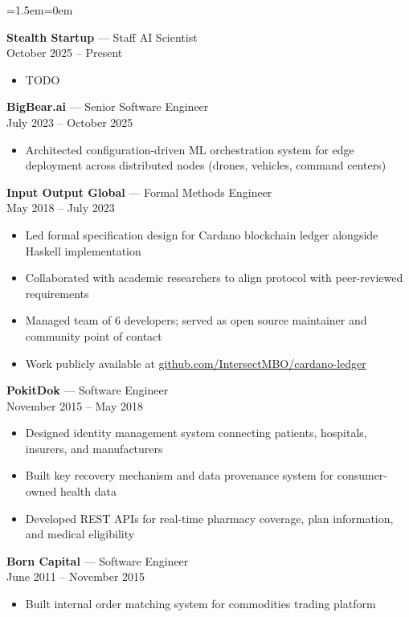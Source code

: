 \documentclass[11pt,letterpaper]{article}
\newenvironment{indentblock}{\begin{list}{}{\leftmargin=1.5em\rightmargin=0em}\item[]}{\end{list}}
\begin{document}
\begin{indentblock}
{\color{headercolor}\textbf{Stealth Startup}} --- Staff AI Scientist \\
October 2025 -- Present
\begin{itemize}[leftmargin=2em]
  \item TODO
\end{itemize}

\vspace{2pt}

{\color{headercolor}\textbf{BigBear.ai}} --- Senior Software Engineer \\
July 2023 -- October 2025
\begin{itemize}[leftmargin=2em]
  \item Architected configuration-driven ML orchestration system for edge deployment across distributed nodes (drones, vehicles, command centers)
\end{itemize}

\vspace{2pt}

{\color{headercolor}\textbf{Input Output Global}} --- Formal Methods Engineer \\
May 2018 -- July 2023
\begin{itemize}[leftmargin=2em]
  \item Led formal specification design for Cardano blockchain ledger alongside Haskell implementation
  \item Collaborated with academic researchers to align protocol with peer-reviewed requirements
  \item Managed team of 6 developers; served as open source maintainer and community point of contact
  \item Work publicly available at \href{https://github.com/IntersectMBO/cardano-ledger}{github.com/IntersectMBO/cardano-ledger}
\end{itemize}

\vspace{2pt}

{\color{headercolor}\textbf{PokitDok}} --- Software Engineer \\
November 2015 -- May 2018
\begin{itemize}[leftmargin=2em]
  \item Designed identity management system connecting patients, hospitals, insurers, and manufacturers
  \item Built key recovery mechanism and data provenance system for consumer-owned health data
  \item Developed REST APIs for real-time pharmacy coverage, plan information, and medical eligibility
\end{itemize}

\vspace{2pt}

{\color{headercolor}\textbf{Born Capital}} --- Software Engineer \\
June 2011 -- November 2015
\begin{itemize}[leftmargin=2em]
  \item Built internal order matching system for commodities trading platform
\end{itemize}
\end{indentblock}
\end{document}
